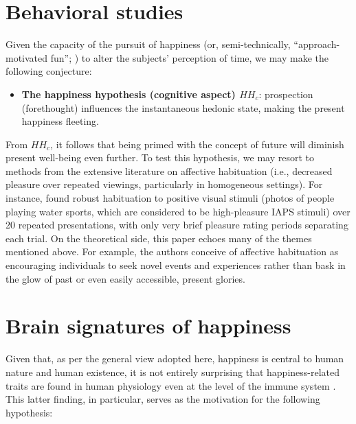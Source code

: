 \documentclass[11pt]{article}
\begin{document}
\section{Behavioral studies}

Given the capacity of the pursuit of happiness (or, semi-technically,
``approach-motivated fun''; \citealp*{GablePoole12}) to alter the
subjects' perception of time, we may make the following conjecture:

\begin{itemize}

  \item \textbf{The happiness hypothesis (cognitive aspect) $HH_c$}:
    prospection (forethought) influences the instantaneous hedonic
    state, making the present happiness fleeting.

\end{itemize}

\noindent
From $HH_c$, it follows that being primed with the concept of future
will diminish present well-being even further. To test this
hypothesis, we may resort to methods from the extensive literature on
affective habituation (i.e., decreased pleasure over repeated
viewings, particularly in homogeneous settings).  For instance,
\citet{LeventhalEtAl07} found robust habituation to positive visual
stimuli (photos of people playing water sports, which are considered
to be high-pleasure IAPS stimuli) over 20 repeated presentations, with
only very brief pleasure rating periods separating each trial. On the
theoretical side, this paper echoes many of the themes mentioned
above. For example, the authors conceive of affective habituation as
encouraging individuals to seek novel events and experiences rather
than bask in the glow of past or even easily accessible, present
glories. 

\section{Brain signatures of happiness}

Given that, as per the general view adopted here, happiness is central
to human nature and human existence, it is not entirely surprising
that happiness-related traits are found in human physiology even at
the level of the immune system \citep{FredricksonEtAl13}. This latter
finding, in particular, serves as the motivation for the following
hypothesis: 
\end{document}
